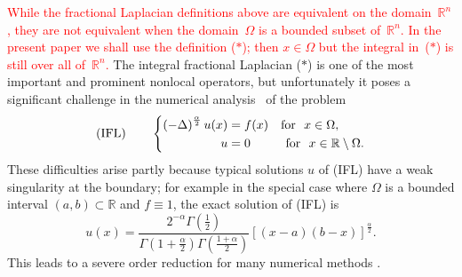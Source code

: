 \documentclass[smallextended]{svjour3}       %
\newcommand{\tcr}[1]{\textcolor{red}{#1}}
\begin{document}
	
\tcr{While the  fractional Laplacian definitions above are equivalent on the domain~$\mathbb{R}^n$, they are not equivalent
when the domain~$\Omega$ is  a bounded subset of~$\mathbb{R}^n$. In the present paper we shall use the definition ($*$);
then $x\in\Omega$ but the integral in~($*$) is still over all of~$\mathbb{R}^n$.}
The integral fractional Laplacian ($*$) is one of the most important and  prominent nonlocal operators, but unfortunately it poses a significant challenge in the numerical analysis~\cite{CSW:21,D'Elia:13,HuangO:14}  of the problem
	\begin{equation*}
		{\rm (IFL)}~~~~~~\left\{ \begin{split}	
			\left(-\Delta\right)^{\frac{\alpha}{2}}u(x)&=f(x)	~~~	{\rm for}~~x\in \Omega, \\	
			u& =0	~~~~~~\,~~	{\rm for}~~ x\in \mathbb{R} \setminus\Omega.
		\end{split} \right.
	\end{equation*}
	These difficulties arise partly because typical solutions $u$ of (IFL)
 have a weak singularity at the boundary; for example in the special case where $\Omega$ is a bounded interval $(a,b)\subset\mathbb{R}$ and $f\equiv 1$, the exact solution of (IFL) is \cite{Getoor1961,HuangO:14,RosOtonSerra:14}
\begin{equation}\label{uf1}
		u(x)=\frac{2^{-\alpha} \varGamma \left( \frac{1}{2} \right)}{\varGamma \left( 1+\frac{\alpha}{2} \right) \varGamma \left( \frac{1+\alpha}{2} \right)} \left[ (x-a)\left( b-x \right) \right] ^{\frac{\alpha}{2}}.
\end{equation}
This leads to a severe order reduction for many numerical  methods \cite{D'Elia:13,HuangO:14}.
\end{document}
